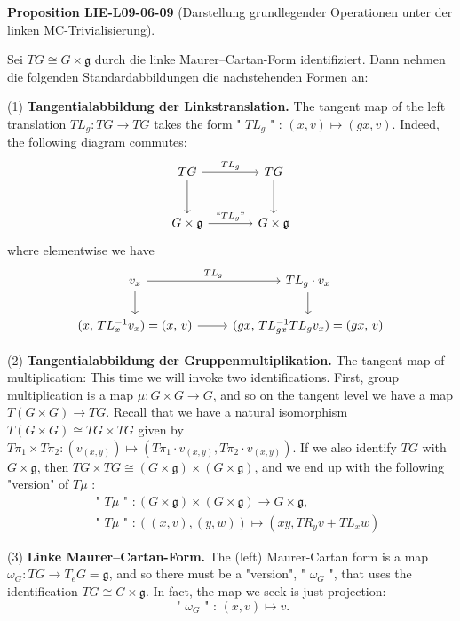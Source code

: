 \documentclass[10pt, letterpaper]{article}
\newcommand{\CustomHeading}[3]{%
  \par\medskip\noindent%
  \textbf{#1 #2} \textnormal{(#3)}.\enskip%
}
\newenvironment{PROP}[2]{\CustomHeading{Proposition}{#1}{#2}}{}
\begin{document}
\begin{PROP}{LIE-L09-06-09}{Darstellung grundlegender Operationen unter der linken MC-Trivialisierung}
Sei $T G\cong G\times\mathfrak g$ durch die linke Maurer--Cartan-Form
identifiziert. Dann nehmen die folgenden Standardabbildungen
die nachstehenden Formen an:

(1) \textbf{Tangentialabbildung der Linkstranslation.} The tangent map of the left translation $T L_{g}: T G \rightarrow T G$ takes the form " $T L_{g}$ " : $(x, v) \mapsto(g x, v)$. Indeed, the following diagram commutes:
\[
\begin{tikzcd}[row sep=large, column sep=large]
T G \arrow[r, "T L_g"] \arrow[d] & T G \arrow[d] \\
G \times \mathfrak{g} \arrow[r, "{\text{``}T L_g\text{''}}"] & G \times \mathfrak{g}
\end{tikzcd}
\]
where elementwise we have
\[
\begin{tikzcd}
v_x \arrow[r, "TL_g"] \arrow[d] & TL_g \cdot v_x \arrow[d] \\
(x,\, TL_x^{-1} v_x) = (x,\, v) \arrow[r] & (gx,\, TL_{gx}^{-1} TL_g v_x) = (gx,\, v)
\end{tikzcd}
\]


(2) \textbf{Tangentialabbildung der Gruppenmultiplikation.} The tangent map of multiplication: This time we will invoke two identifications. First, group multiplication is a map $\mu: G \times G \rightarrow G$, and so on the tangent level we have a map $T(G \times G) \rightarrow T G$. Recall that we have a natural isomorphism $T(G \times G) \cong T G \times T G$ given by $T \pi_{1} \times T \pi_{2}:\left(v_{(x, y)}\right) \mapsto\left(T \pi_{1} \cdot v_{(x, y)}, T \pi_{2} \cdot v_{(x, y)}\right)$. If we also identify $T G$ with $G \times \mathfrak{g}$, then $T G \times T G \cong(G \times \mathfrak{g}) \times(G \times \mathfrak{g})$, and we end up with the following "version" of $T \mu$ :
$$
\begin{aligned}
& \text { " } T \mu \text { " }:(G \times \mathfrak{g}) \times(G \times \mathfrak{g}) \rightarrow G \times \mathfrak{g}, \\
& \text { " } T \mu \text { " }:((x, v),(y, w)) \mapsto\left(x y, T R_{y} v+T L_{x} w\right)
\end{aligned}
$$

(3) \textbf{Linke Maurer--Cartan-Form.} The (left) Maurer-Cartan form is a map $\omega_{G}: T G \rightarrow T_{e} G=\mathfrak{g}$, and so there must be a "version", " $\omega_{G}$ ", that uses the identification $T G \cong G \times \mathfrak{g}$. In fact, the map we seek is just projection:
$$
\text { " } \omega_{G} \text { " : }(x, v) \mapsto v .
$$


\end{PROP}
\end{document}
